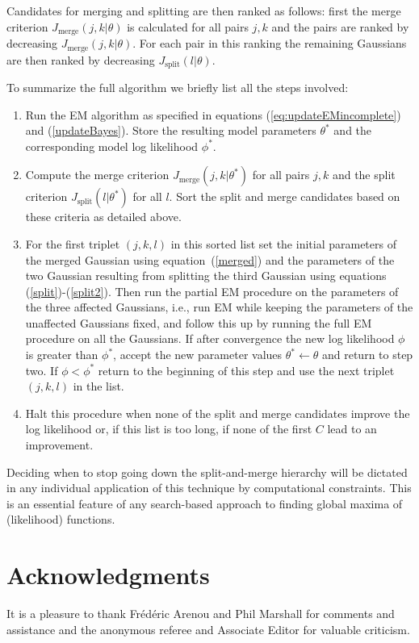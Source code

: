 \documentclass[aoas,preprint,authoryear,round]{imsart}
\newcommand{\eqnnumber}{equation}
\newcommand{\ie}{i.e.}
\begin{document}
Candidates for merging and splitting are then ranked as follows: first
the merge criterion $J_{\mbox{merge}}(j,k|\theta)$ is calculated for
all pairs $j,k$ and the pairs are ranked by decreasing
$J_{\mbox{merge}}(j,k|\theta)$. For each pair in this ranking the
remaining Gaussians are then ranked by decreasing
$J_{\mbox{split}}(l|\theta)$.


To summarize the full algorithm we briefly list all the steps
involved:
\begin{enumerate}
\item Run the EM algorithm as specified in \eqnnumber s
(\ref{eq:updateEMincomplete}) and (\ref{updateBayes}). Store the
resulting model parameters $\theta^*$ and the corresponding model log
likelihood $\phi^*$.
\item Compute the merge criterion $J_{\mbox{merge}}(j,k|\theta^*)$ for
all pairs $j,k$ and the split criterion $J_{\mbox{split}}(l|\theta^*)$
for all $l$. Sort the split and merge candidates based on these
criteria as detailed above.
\item For the first triplet $(j,k,l)$ in this sorted list set the
initial parameters of the merged Gaussian using \eqnnumber\ (\ref{merged}) and the
parameters of the two Gaussian resulting from splitting the third
Gaussian using \eqnnumber s (\ref{split})-(\ref{split2}). Then run the
partial EM procedure on the parameters of the three affected
Gaussians, \ie, run EM while keeping the parameters of the unaffected
Gaussians fixed, and follow this up by running the full EM procedure
on all the Gaussians. If after convergence the new log likelihood
$\phi$ is greater than $\phi^*$, accept the new parameter values
$\theta^* \leftarrow \theta$ and return to step two. If $\phi <
\phi^*$ return to the beginning of this step and use the next triplet
$(j,k,l)$ in the list.
\item Halt this procedure when none of the split and merge candidates
improve the log likelihood or, if this list is too long, if none of
the first $C$ lead to an improvement.
\end{enumerate}

Deciding when to stop going down the split-and-merge hierarchy will be
dictated in any individual application of this technique by
computational constraints. This is an essential feature of any
search-based approach to finding global maxima of (likelihood)
functions.




\section*{Acknowledgments}
It is a pleasure to thank Fr{\'e}d{\'e}ric Arenou and Phil Marshall
for comments and assistance and the anonymous referee and Associate
Editor for valuable criticism.
\end{document}

